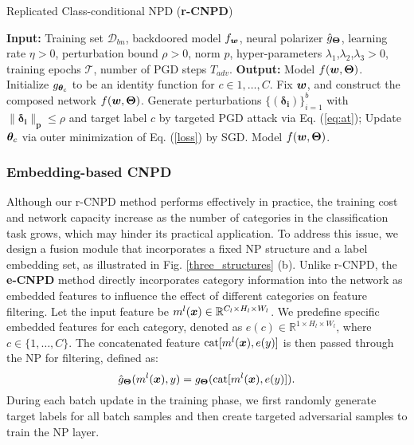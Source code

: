 \begin{algorithm}[h]
\caption{Replicated Class-conditional NPD (\textbf{r-CNPD})}\label{alg2_rnpd}
\begin{algorithmic}[1]
\STATE \textbf{Input:} Training set $\mathcal{D}_{bn}$, backdoored model $f_{\bm{w}}$, neural polarizer $\hat{g}_{\bm{\Theta}}$,
learning rate $\eta>0$, perturbation bound $\rho>0$, norm $p$, hyper-parameters $\lambda_1$,$\lambda_2$,$\lambda_3>0$, training epochs $\mathcal{T}$, number of PGD steps $T_{adv}$.
\STATE \textbf{Output:} Model $f(\bm{w},\bm{\Theta})$.
\STATE Initialize $g_{\bm{\theta}_c}$ to be an identity function for $c\in {1,\ldots,C}$. Fix $\bm{w}$, and construct the composed network $f(\bm{w},\bm{\Theta})$.
\STATE Generate perturbations $\{(\boldsymbol{\delta_i})\}_{i=1}^{b}$ with $\boldsymbol{\|\delta_{i}\|_p}\leq \rho$ and target label $c$ by targeted PGD attack \cite{madry2017towards} via Eq. (\ref{eq:at});
\STATE Update $\bm{\theta}_c$ via outer minimization of Eq. (\ref{loss}) by SGD.
\ENDFOR
\ENDFOR
\ENDFOR
\RETURN Model $f(\bm{w},\bm{\Theta})$. 
\end{algorithmic}
\end{algorithm}


\subsubsection{Embedding-based CNPD\label{sec3.4.2}}
Although our r-CNPD method performs effectively in practice, the training cost and network capacity increase as the number of categories in the classification task grows, which may hinder its practical application. To address this issue, we design a fusion module that incorporates a fixed NP structure and a label embedding set, as illustrated in Fig. \ref{three_structures} (b).
Unlike r-CNPD, the \textbf{e-CNPD} method directly incorporates category information into the network as embedded features to influence the effect of different categories on feature filtering. Let the input feature be \(m^l(\bm{x}) \in \mathbb{R}^{C_l \times H_l \times W_l}\). We predefine specific embedded features for each category, denoted as \(e(c) \in \mathbb{R}^{1 \times H_l \times W_l}\), where \(c \in \{1, \ldots, C\}\). The concatenated feature \(\text{cat}[m^l(\bm{x}), e(y)]\) is then passed through the NP for filtering, defined as:
\begin{equation}
    \hat{g}_{\bm{\Theta}}(m^{l}(\bm{x}),y) = g_{\bm{\Theta}}(\text{cat}[m^{l}(\bm{x}),e(y)]).
\end{equation}
During each batch update in the training phase, we first randomly generate target labels for all batch samples and then create targeted adversarial samples to train the NP layer.

